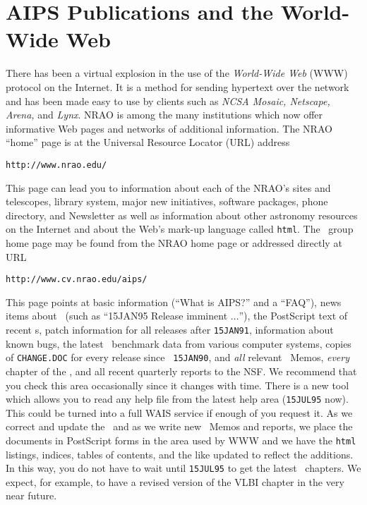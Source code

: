 \vfill
\eject

\section{AIPS Publications and the World-Wide Web}

     There has been a virtual explosion in the use of the {\it
World-Wide Web\/} (WWW) protocol on the Internet.  It is a method for
sending hypertext over the network and has been made easy to use by
clients such as {\it NCSA Mosaic, Netscape, Arena,\/} and {\it
Lynx\/}.  NRAO is among the many institutions which now offer
informative Web pages and networks of additional information.  The
NRAO ``home'' page is at the Universal Resource Locator (URL) address
\begin{center}
\vskip -20pt
{\tt http://www.nrao.edu/}
\vskip -10pt
\end{center}
This page can lead you to information about each of the NRAO's sites
and telescopes, library system, major new initiatives, software
packages, phone directory, and Newsletter as well as information about
other astronomy resources on the Internet and about the Web's mark-up
language called {\tt html}.  The \AIPS\ group home page
may be found from the NRAO home page or addressed directly at URL
\begin{center}
\vskip -10pt
{\tt http://www.cv.nrao.edu/aips/}
\vskip -10pt
\end{center}
This page points at basic information (``What is AIPS?'' and a
``FAQ''), news items about \AIPS\ (such as ``15JAN95 Release imminent
$\ldots$''), the PostScript text of recent \AIPSLETTER s, patch
information for all releases after {\tt 15JAN91}, information about
known bugs, the latest \AIPS\ benchmark data from various computer
systems, copies of {\tt CHANGE.DOC} for every release since {\tt
15JAN90}, and {\it all} relevant \AIPS\ Memos, {\it every} chapter of
the \Cookbook, and all recent quarterly reports to the \hbox{NSF}.  We
recommend that you check this area occasionally since it changes with
time.  There is a new tool which allows you to read any help file from
the latest help area ({\tt 15JUL95} now).  This could be turned into a
full WAIS service if enough of you request it.  As we correct and
update the \Cookbook\ and as we write new \AIPS\ Memos and reports, we
place the documents in PostScript forms in the area used by WWW and we
have the {\tt html} listings, indices, tables of contents, and the
like updated to reflect the additions.  In this way, you do not have
to wait until {\tt 15JUL95} to get the latest \Cookbook\ chapters.  We
expect, for example, to have a revised version of the VLBI chapter in
the very near future.

